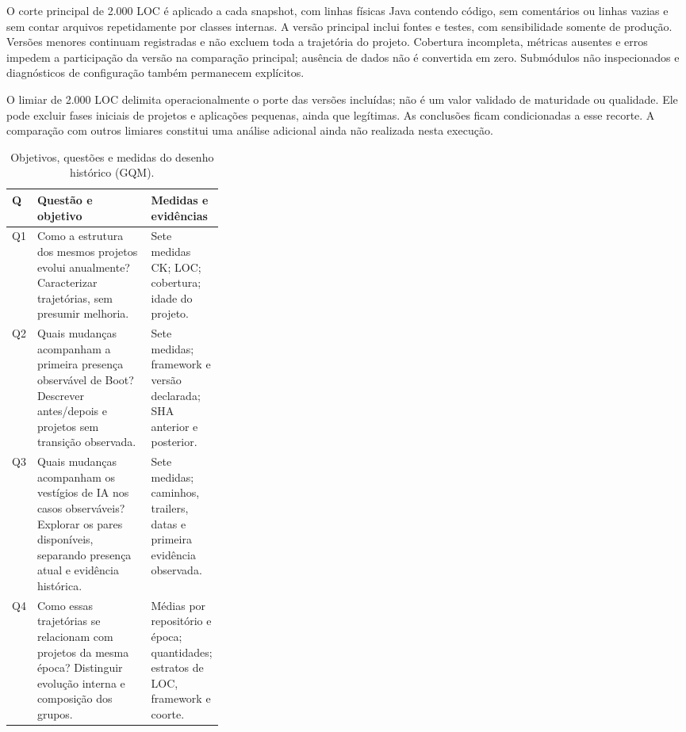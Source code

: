 O corte principal de 2.000 LOC é aplicado a cada snapshot, com linhas físicas Java contendo código, sem comentários ou linhas vazias e sem contar arquivos repetidamente por classes internas. A versão principal inclui fontes e testes, com sensibilidade somente de produção. Versões menores continuam registradas e não excluem toda a trajetória do projeto. Cobertura incompleta, métricas ausentes e erros impedem a participação da versão na comparação principal; ausência de dados não é convertida em zero. Submódulos não inspecionados e diagnósticos de configuração também permanecem explícitos.

O limiar de 2.000 LOC delimita operacionalmente o porte das versões incluídas; não é um valor validado de maturidade ou qualidade. Ele pode excluir fases iniciais de projetos e aplicações pequenas, ainda que legítimas. As conclusões ficam condicionadas a esse recorte. A comparação com outros limiares constitui uma análise adicional ainda não realizada nesta execução.

\begin{table}[H]
\centering\footnotesize
\caption{Objetivos, questões e medidas do desenho histórico (GQM).}
\label{tab:gqm-objetivos}
\begin{tabularx}{\linewidth}{|p{0.05\linewidth}|X|p{0.26\linewidth}|}
\hline
\textbf{Q} & \textbf{Questão e objetivo} & \textbf{Medidas e evidências} \\\hline
Q1 & Como a estrutura dos mesmos projetos evolui anualmente? Caracterizar trajetórias, sem presumir melhoria. & Sete medidas CK; LOC; cobertura; idade do projeto. \\\hline
Q2 & Quais mudanças acompanham a primeira presença observável de Boot? Descrever antes/depois e projetos sem transição observada. & Sete medidas; framework e versão declarada; SHA anterior e posterior. \\\hline
Q3 & Quais mudanças acompanham os vestígios de IA nos casos observáveis? Explorar os pares disponíveis, separando presença atual e evidência histórica. & Sete medidas; caminhos, trailers, datas e primeira evidência observada. \\\hline
Q4 & Como essas trajetórias se relacionam com projetos da mesma época? Distinguir evolução interna e composição dos grupos. & Médias por repositório e época; quantidades; estratos de LOC, framework e coorte. \\\hline
\end{tabularx}
\end{table}

